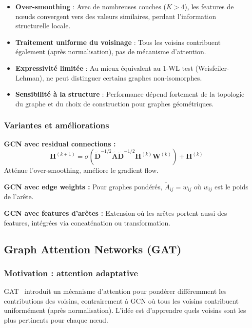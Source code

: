 \begin{itemize}
    \item \textbf{Over-smoothing} : Avec de nombreuses couches ($K > 4$), les features de nœuds convergent vers des valeurs similaires, perdant l'information structurelle locale.
    \item \textbf{Traitement uniforme du voisinage} : Tous les voisins contribuent également (après normalisation), pas de mécanisme d'attention.
    \item \textbf{Expressivité limitée} : Au mieux équivalent au 1-WL test (Weisfeiler-Lehman), ne peut distinguer certains graphes non-isomorphes.
    \item \textbf{Sensibilité à la structure} : Performance dépend fortement de la topologie du graphe et du choix de construction pour graphes géométriques.
\end{itemize}

\subsubsection{Variantes et améliorations}

\textbf{GCN avec residual connections :}
\[
\mathbf{H}^{(k+1)} = \sigma\left(\tilde{\mathbf{D}}^{-1/2}\tilde{\mathbf{A}}\tilde{\mathbf{D}}^{-1/2}\mathbf{H}^{(k)}\mathbf{W}^{(k)}\right) + \mathbf{H}^{(k)}
\]
Atténue l'over-smoothing, améliore le gradient flow.

\textbf{GCN avec edge weights :}
Pour graphes pondérés, $\tilde{A}_{ij} = w_{ij}$ où $w_{ij}$ est le poids de l'arête.

\textbf{GCN avec features d'arêtes :}
Extension où les arêtes portent aussi des features, intégrées via concaténation ou transformation.

\subsection{Graph Attention Networks (GAT)}

\subsubsection{Motivation : attention adaptative}

GAT~\cite{Velickovic2018} introduit un mécanisme d'attention pour pondérer différemment les contributions des voisins, contrairement à GCN où tous les voisins contribuent uniformément (après normalisation). L'idée est d'apprendre quels voisins sont les plus pertinents pour chaque nœud.

